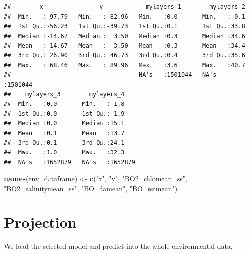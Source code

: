 \documentclass[
]{book}
\newenvironment{Shaded}{\begin{snugshade}}{\end{snugshade}}
\newcommand{\AttributeTok}[1]{\textcolor[rgb]{0.13,0.29,0.53}{#1}}
\newcommand{\CommentTok}[1]{\textcolor[rgb]{0.56,0.35,0.01}{\textit{#1}}}
\newcommand{\FunctionTok}[1]{\textcolor[rgb]{0.13,0.29,0.53}{\textbf{#1}}}
\newcommand{\NormalTok}[1]{#1}
\newcommand{\OtherTok}[1]{\textcolor[rgb]{0.56,0.35,0.01}{#1}}
\newcommand{\SpecialCharTok}[1]{\textcolor[rgb]{0.81,0.36,0.00}{\textbf{#1}}}
\newcommand{\StringTok}[1]{\textcolor[rgb]{0.31,0.60,0.02}{#1}}
\begin{document}
\begin{verbatim}
##        x                y            mylayers_1        mylayers_2     
##  Min.   :-97.79   Min.   :-82.96   Min.   :0.0       Min.   : 0.1     
##  1st Qu.:-56.23   1st Qu.:-39.73   1st Qu.:0.1       1st Qu.:33.8     
##  Median :-14.67   Median :  3.50   Median :0.3       Median :34.6     
##  Mean   :-14.67   Mean   :  3.50   Mean   :0.3       Mean   :34.4     
##  3rd Qu.: 26.90   3rd Qu.: 46.73   3rd Qu.:0.4       3rd Qu.:35.6     
##  Max.   : 68.46   Max.   : 89.96   Max.   :3.6       Max.   :40.7     
##                                    NA's   :1501044   NA's   :1501044  
##    mylayers_3        mylayers_4     
##  Min.   :0.0       Min.   :-1.8     
##  1st Qu.:0.0       1st Qu.: 1.9     
##  Median :0.0       Median :15.1     
##  Mean   :0.1       Mean   :13.7     
##  3rd Qu.:0.1       3rd Qu.:24.1     
##  Max.   :1.0       Max.   :32.3     
##  NA's   :1652879   NA's   :1652879
\end{verbatim}

\begin{Shaded}
\begin{Highlighting}[]
\FunctionTok{names}\NormalTok{(env\_dataframe) }\OtherTok{\textless{}{-}} \FunctionTok{c}\NormalTok{(}\StringTok{"x"}\NormalTok{, }\StringTok{"y"}\NormalTok{, }\StringTok{"BO2\_chlomean\_ss"}\NormalTok{, }\StringTok{"BO2\_salinitymean\_ss"}\NormalTok{, }\StringTok{"BO\_damean"}\NormalTok{, }\StringTok{"BO\_sstmean"}\NormalTok{)}
\end{Highlighting}
\end{Shaded}

\section{Projection}\label{projection}

We load the selected model and predict into the whole environmental data.

\begin{Shaded}
\end{Shaded}
\end{document}
